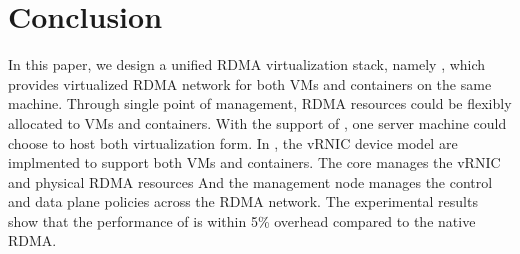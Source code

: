 \section{Conclusion} \label{conclusion}
In this paper, we design a unified RDMA virtualization stack, namely \sys, which provides virtualized RDMA network for both VMs and containers on the same machine.
Through single point of management, RDMA resources could be flexibly allocated to VMs and containers. With the support of \sys, one server machine could choose to host both virtualization form.
In \sys, the vRNIC device model are implmented to support both VMs and containers. The \sys core manages the vRNIC and physical RDMA resources And the management node manages the control and data plane policies across the RDMA network. The experimental results show that the performance of \sys is within 5\% overhead compared to the native RDMA.